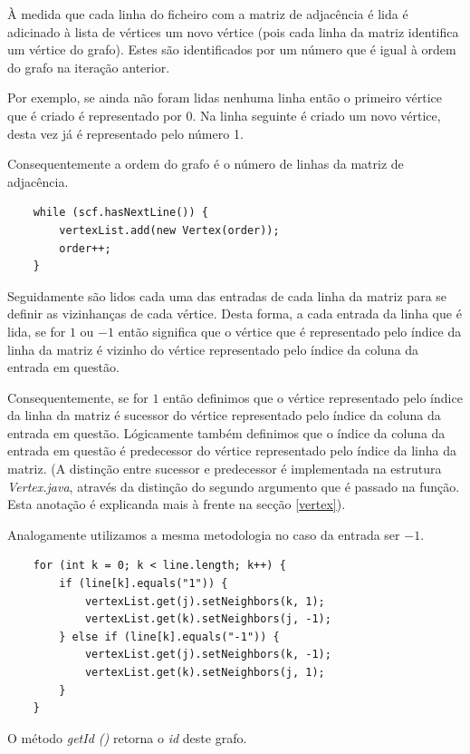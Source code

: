 \documentclass[a4paper,12pt]{report}
\begin{document}
À medida que cada linha do ficheiro com a matriz de adjacência é lida é adicinado à lista de vértices um novo vértice (pois cada linha da matriz identifica um vértice do grafo). Estes são identificados por um número que é igual à ordem do grafo na iteração anterior.

Por exemplo, se ainda não foram lidas nenhuma linha então o primeiro vértice que é criado é representado por 0. Na linha seguinte é criado um novo vértice, desta vez já é representado pelo número 1.

Consequentemente a ordem do grafo é o número de linhas da matriz de adjacência.

\begin{lstlisting}
    while (scf.hasNextLine()) {
        vertexList.add(new Vertex(order));       
        order++;
    }
\end{lstlisting}

Seguidamente são lidos cada uma das entradas de cada linha da matriz para se definir as vizinhanças de cada vértice. Desta forma, a cada entrada da linha que é lida, se for $1$ ou $-1$ então significa que o vértice que é representado pelo índice da linha da matriz é vizinho do vértice representado pelo índice da coluna da entrada em questão.

Consequentemente, se for $1$ então definimos que o vértice representado pelo índice da linha da matriz é sucessor do vértice representado pelo índice da coluna da entrada em questão. Lógicamente também definimos que o índice da coluna da entrada em questão é predecessor do vértice representado pelo índice da linha da matriz. (A distinção entre sucessor e predecessor é implementada na estrutura \textit{Vertex.java}, através da distinção do segundo argumento que é passado na função. Esta anotação é explicanda mais à frente na secção \ref{vertex}).

Analogamente utilizamos a mesma metodologia no caso da entrada ser $-1$.

\begin{lstlisting}
    for (int k = 0; k < line.length; k++) {
        if (line[k].equals("1")) {
            vertexList.get(j).setNeighbors(k, 1);
            vertexList.get(k).setNeighbors(j, -1);
        } else if (line[k].equals("-1")) {
            vertexList.get(j).setNeighbors(k, -1);
            vertexList.get(k).setNeighbors(j, 1);
        }
    }
\end{lstlisting}

O método \textit{getId ()} retorna o \textit{id} deste grafo.
\end{document}
